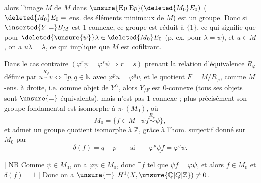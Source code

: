 
alors l'image $\bar M$ de $M$ dans $\unsure{\mathrm{Ep}|\mathrm{E}p}(\deleted{M_0}E_0)$ ($\deleted{M_0}E_0=$ ens. des
éléments minimaux de $M$) est un groupe. Donc
si $\inserted{Y=}B_M$ est $1$-connexe, ce groupe est réduit à $\{1\}$,
ce qui signifie que pour $\deleted{\unsure{\psi}}\lambda\in\deleted{M_0}E_0$ (p. ex.
pour $\lambda=\psi$),  et $u\in M$, on a $u\lambda=\lambda$,
ce qui implique que $M$ est cofiltrant.

Dans le cas contraire $(\varphi^r\psi=\varphi^s\psi\Longrightarrow r=s)$
prenant la relation d'équivalence  $R_\varphi$  définie par
$u\overset{R_\varphi}{\sim}v\Longleftrightarrow\exists p,q\in\mathbb N$ avec $\varphi^p u=\varphi^q v$, et
le quotient $F=M/R_\varphi$,  comme $M$-ens.
à droite, i.e. comme objet de $Y^\wedge$, alors
$Y_{/F}$ est  $0$-connexe (tous ses objets sont $\unsure{=}$
équivalents), mais  n'est pas $1$-connexe ;
plus précisément son groupe fondamental
est isomorphe à $\pi_1(M_0)$, où 
\[
M_0=\{f\in M\mid\psi f\overset{R_\varphi}{\sim}\psi\},
\]
et admet un groupe quotient isomorphe à $\mathbb Z$,
grâce à l'hom. surjectif
donné sur $M_0$ par
\[
\delta(f)=q-p\qquad\text{si}\qquad\varphi^p\underline{\psi f}=\varphi^q\psi.
\]

[ \uline{NB}   Comme $\psi\in M_0$, on a $\varphi\psi\in M_0$,
 donc $\exists f$ tel que $\psi f=\varphi\psi$,
et alors $f\in M_0$ et $\delta(f)=1$ ] Donc on a $\unsure{=}$
$H^{1}(X,\unsure{\mathbb Q|Q|\mathbb Z})\ne0$.

